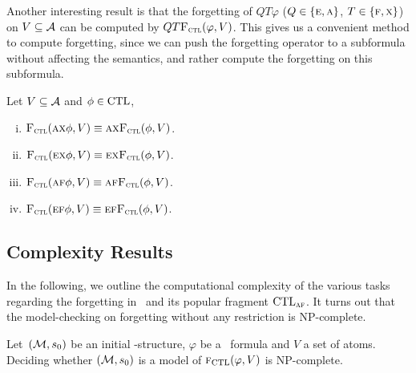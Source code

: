 \documentclass{article}
\begin{document}
Another interesting result is that the forgetting of $Q T \varphi$ ($Q\in \{\textsc{e}, \textsc{a}\}$, $T \in \{\textsc{f}, \textsc{x}\}$) on $V\subseteq {\cal A}$ can be computed by $QT {\textsc{F}_{\textsc{ctl}}}(\varphi, V)$. This gives us a convenient method to compute forgetting, since we can push the forgetting operator to a subformula without affecting the semantics, and rather compute the forgetting on this subformula.
\begin{proposition}[Homogeneity]\label{pro:ctl:forget:2}
  Let $V\subseteq\cal A$ and $\phi \in \textrm{CTL}$,%
  \begin{enumerate}[(i)]
    \item ${\textsc{F}_{\textsc{ctl}}}(\textsc{a}\textsc{x}\phi,V)\equiv \textsc{a}\textsc{x} {\textsc{F}_{\textsc{ctl}}}(\phi,V)$.
    \item ${\textsc{F}_{\textsc{ctl}}}(\textsc{e}\textsc{x}\phi,V)\equiv\textsc{e}\textsc{x} {\textsc{F}_{\textsc{ctl}}}(\phi,V)$.
    \item ${\textsc{F}_{\textsc{ctl}}}(\textsc{a} \textsc{f}\phi,V)\equiv \textsc{a} \textsc{f} {\textsc{F}_{\textsc{ctl}}}(\phi,V)$.
    \item ${\textsc{F}_{\textsc{ctl}}}(\textsc{e}\textsc{f}\phi,V)\equiv\textsc{e}\textsc{f} {\textsc{F}_{\textsc{ctl}}}(\phi,V)$.
  \end{enumerate}
\end{proposition}



\subsection{Complexity Results}
In the following, we outline the computational complexity of the various tasks regarding the forgetting in \CTL\ and its popular fragment $\textrm{CTL}_{\textsc{a}\textsc{f}}$.  It turns out that the model-checking on forgetting without any restriction is NP-complete.
\begin{proposition}\label{modelChecking}
Let~$({\cal M},s_0)$ be an initial \MPK-structure, $\varphi$ be a \CTL\ formula and $V$ a set of atoms. Deciding whether $({\cal M},s_0)$ is a model of ${\textsc{f}_{\textrm{CTL}}}(\varphi, V )$ is NP-complete.
\end{proposition}
\end{document}
